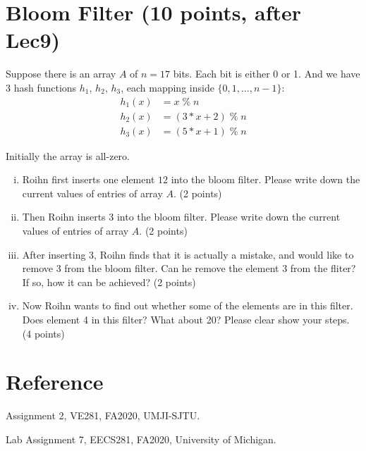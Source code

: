 \documentclass[11pt]{exam}
\begin{document}
\newpage

\section{Bloom Filter (10 points, after Lec9)}
Suppose there is an array $A$ of $n=17$ bits. Each bit is either 0 or 1. And we have 3 hash functions $h_1$, $h_2$, $h_3$, each mapping inside $\{0,1,\dots,n-1\}$:
\begin{align*}
h_1(x) &= x \;\%\; n\\
h_2(x) &= (3*x+2) \;\%\; n\\
h_3(x) &= (5*x+1) \;\%\; n 
\end{align*}

Initially the array is all-zero.
\begin{enumerate}[i)]
\item Roihn first inserts one element $12$ into the bloom filter. Please write down the current values of entries of array $A$. (2 points)
\begin{solution}
\end{solution}
\item Then Roihn inserts 3 into the bloom filter. Please write down the current values of entries of array $A$. (2 points)
\begin{solution}
\end{solution}
\item After inserting 3, Roihn finds that it is actually a mistake, and would like to remove 3 from the bloom filter. Can he remove the element 3 from the fliter? If so, how it can be achieved? (2 points)
\begin{solution}
\end{solution}
\item Now Roihn wants to find out whether some of the elements are in this filter. Does element 4 in this filter? What about 20? Please clear show your steps. (4 points)
\begin{solution}
\end{solution}
\end{enumerate}

\section*{Reference}
Assignment 2, VE281, FA2020, UMJI-SJTU.

Lab Assignment 7, EECS281, FA2020, University of Michigan.
\end{document}
